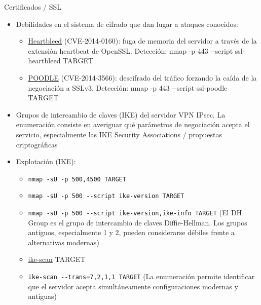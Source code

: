 \documentclass[aspectratio=169,11pt]{beamer}
\newcommand{\cmd}[1]{\texttt{#1}}
\begin{document}
\begin{frame}[allowframebreaks]{Certificados / SSL}
\begin{itemize}
  \item Debilidades en el sistema de cifrado que dan lugar a ataques conocidos:
    \begin{itemize}
    \item \href{https://heartbleed.com/}{Heartbleed} (CVE-2014-0160): fuga de memoria del servidor a través de la extensión heartbeat de OpenSSL. Detección: nmap -p 443 -{}-script ssl-heartbleed TARGET
    \item \href{https://www.openssl.org/news/secadv/20141015.txt}{POODLE} (CVE-2014-3566): descifrado del tráfico forzando la caída de la negociación a SSLv3. Detección: nmap -p 443 -{}-script ssl-poodle TARGET
    \end{itemize}
  \item Grupos de intercambio de claves (IKE) del servidor VPN IPsec. La enumeración consiste en averiguar qué parámetros de negociación acepta el servicio, especialmente las IKE Security Associations / propuestas criptográficas
  \item Explotación (IKE):
  \begin{itemize}
    \item \cmd{nmap -sU -p 500,4500 TARGET}
    \item \cmd{nmap -sU -p 500 -{}-script ike-version TARGET}
    \item \cmd{nmap -sU -p 500 -{}-script ike-version,ike-info TARGET} (El DH Group es el grupo de intercambio de claves Diffie-Hellman. Los grupos antiguos, especialmente 1 y 2, pueden considerarse débiles frente a alternativas modernas)
    \item \href{https://github.com/royhills/ike-scan}{ike-scan} TARGET
    \item \cmd{ike-scan -{}-trans=7,2,1,1 TARGET} (La enumeración permite identificar que el servidor acepta simultáneamente configuraciones modernas y antiguas)
  \end{itemize}
  \end{itemize}
\end{frame}

\end{document}
